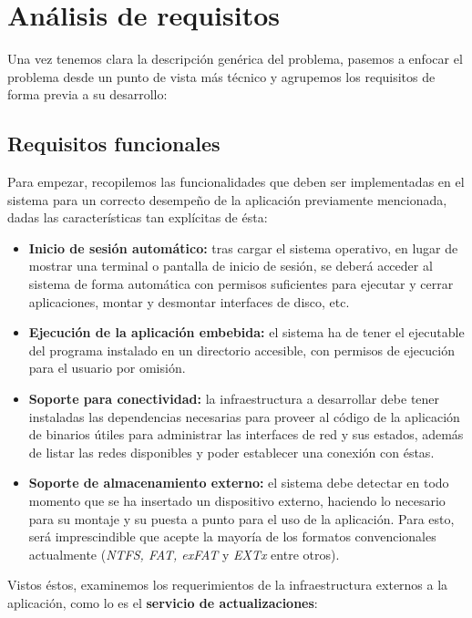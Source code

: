 \chapter{Análisis de requisitos}

Una vez tenemos clara la descripción genérica del problema, pasemos a enfocar el problema desde un punto de vista más técnico y agrupemos los requisitos de forma previa a su desarrollo:

\section{Requisitos funcionales}

Para empezar, recopilemos las funcionalidades que deben ser implementadas en el sistema para un correcto desempeño de la aplicación previamente mencionada, dadas las características tan explícitas de ésta:

\begin{itemize}
	\item \textbf{Inicio de sesión automático:} tras cargar el sistema operativo, en lugar de mostrar una terminal o pantalla de inicio de sesión, se deberá acceder al sistema de forma automática con permisos suficientes para ejecutar y cerrar aplicaciones, montar y desmontar interfaces de disco, etc.
	\item \textbf{Ejecución de la aplicación embebida:} el sistema ha de tener el ejecutable del programa instalado en un directorio accesible, con permisos de ejecución para el usuario por omisión.
	\item \textbf{Soporte para conectividad:} la infraestructura a desarrollar debe tener instaladas las dependencias necesarias para proveer al código de la aplicación de binarios útiles para administrar las interfaces de red y sus estados, además de listar las redes disponibles y poder establecer una conexión con éstas.
	\item \textbf{Soporte de almacenamiento externo:} el sistema debe detectar en todo momento que se ha insertado un dispositivo externo, haciendo lo necesario para su montaje y su puesta a punto para el uso de la aplicación. Para esto, será imprescindible que acepte la mayoría de los formatos convencionales actualmente (\textit{NTFS, FAT, exFAT} y \textit{EXTx} entre otros).
\end{itemize}

Vistos éstos, examinemos los requerimientos de la infraestructura externos a la aplicación, como lo es el \textbf{servicio de actualizaciones}:

